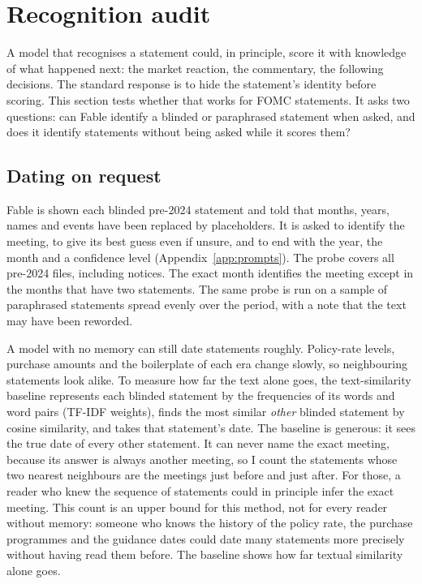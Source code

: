\section{Recognition audit}\label{sec:recognition}

A model that recognises a statement could, in principle, score it with knowledge of what happened next:
the market reaction, the commentary, the following decisions. The standard response is to hide the
statement's identity before scoring. This section tests whether that works for FOMC statements. It asks
two questions: can Fable identify a blinded or paraphrased statement when asked, and does it identify
statements without being asked while it scores them?

\subsection{Dating on request}

Fable is shown each blinded pre-2024 statement and told that months, years, names and events have been
replaced by placeholders. It is asked to identify the meeting, to give its best guess even if unsure, and
to end with the year, the month and a confidence level (Appendix~\ref{app:prompts}). The probe covers all
 pre-2024 files, including  notices. The exact month identifies the
meeting except in the  months that have two statements. The same probe is
run on a sample of  paraphrased statements spread evenly over the period, with a note that
the text may have been reworded.

A model with no memory can still date statements roughly. Policy-rate levels, purchase amounts and the
boilerplate of each era change slowly, so neighbouring statements look alike. To measure how far the
text alone goes, the text-similarity baseline represents each blinded statement by the frequencies of its
words and word pairs (TF-IDF weights), finds the most similar \emph{other} blinded statement by cosine
similarity, and takes that statement's date. The baseline is generous: it sees the true date of every
other statement. It can never name the exact meeting, because its answer is always another meeting, so I
count the statements whose two nearest neighbours are the meetings just before and just after. For
those, a reader who knew the sequence of statements could in principle infer the exact meeting. This
count is an upper bound for this method, not for every reader without memory: someone who knows the
history of the policy rate, the purchase programmes and the guidance dates could date many statements
more precisely without having read them before. The baseline shows how far textual similarity alone
goes.

